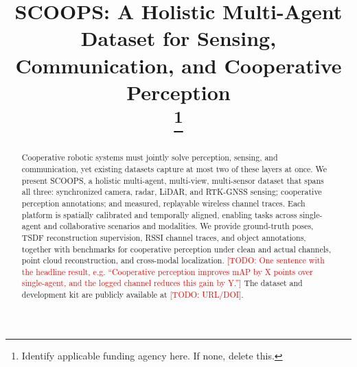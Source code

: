 \documentclass[conference]{IEEEtran}
\newcommand{\todo}[1]{\textcolor{red}{[TODO: #1]}}
\begin{document}
\title{SCOOPS: A Holistic Multi-Agent Dataset for Sensing, Communication, and Cooperative Perception\\
\thanks{Identify applicable funding agency here. If none, delete this.}
}

\author{%
}

\maketitle

\begin{abstract}
Cooperative robotic systems must jointly solve perception, sensing, and
communication, yet existing datasets capture at most two of these layers at
once. We present SCOOPS, a holistic multi-agent, multi-view, multi-sensor
dataset that spans all three: synchronized camera, radar, LiDAR, and RTK-GNSS sensing;
cooperative perception annotations; and measured, replayable wireless channel
traces. Each platform is spatially calibrated and temporally aligned, enabling
tasks across single-agent and collaborative scenarios and modalities. We
provide ground-truth poses, TSDF reconstruction supervision, RSSI channel
traces, and object annotations, together with benchmarks for cooperative
perception under clean and actual channels, point cloud reconstruction, and
cross-modal localization. \todo{One sentence with the headline result, e.g.
``Cooperative perception improves mAP by X points over single-agent, and the
logged channel reduces this gain by Y.''} The dataset and development kit are
publicly available at \todo{URL/DOI}.
\end{abstract}
\end{document}
